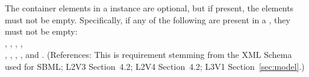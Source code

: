 The  container elements in a \Model instance are optional,
but if present, the elements must not be empty.  Specifically, if
any of the following are present in a \Model, they must not be empty:\\
,
,
, 
,\\
,
,
,
,
 and .  (References:
This is requirement stemming from the XML Schema used for SBML;
L2V3 Section~4.2; L2V4 Section~4.2; L3V1 Section~\ref{sec:model}.)
